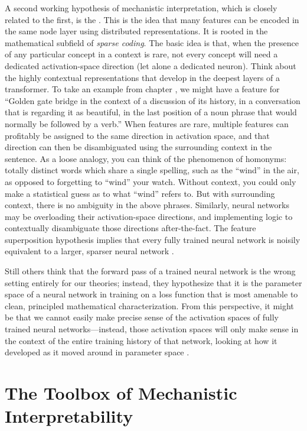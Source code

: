 A second working hypothesis of mechanistic interpretation, which is closely
related to the first, is the . This
is the idea that many features can be encoded in the same node layer using
distributed representations. It is rooted in the mathematical subfield of
\emph{sparse coding}. The basic idea is that, when the presence of any
particular concept in a context is rare, not every concept will need a
dedicated activation-space direction (let alone a dedicated neuron). Think
about the highly contextual representations that develop in the deepest layers
of a transformer. To take an example from chapter , we
might have a feature for ``Golden gate bridge in the context of a discussion of
its history, in a conversation that is regarding it as beautiful, in the last
position of a noun phrase that would normally be followed by a verb.'' When
features are rare, multiple features can profitably be assigned to the same
direction in activation space, and that direction can then be disambiguated
using the surrounding context in the sentence. As a loose analogy, you can
think of the phenomenon of homonyms: totally distinct words which share a
single spelling, such as the ``wind'' in the air, as opposed to forgetting to
``wind'' your watch. Without context, you could only make a statistical guess
as to what ``wind'' refers to. But with surrounding context, there is no
ambiguity in the above phrases. Similarly, neural networks may be overloading
their activation-space directions, and implementing logic to contextually
disambiguate those directions after-the-fact. The feature superposition
hypothesis implies that every fully trained neural network is noisily
equivalent to a larger, sparser neural network \cite{elhage2022superposition}.

Still others think that the forward pass of a trained neural network is the
wrong setting entirely for our theories; instead, they hypothesize that it is
the parameter space of a neural network in training on a loss function that is
most amenable to clean, principled mathematical characterization. From this
perspective, it might be that we cannot easily make precise sense of the
activation spaces of fully trained neural networks---instead, those activation
spaces will only make sense in the context of the entire training history of
that network, looking at how it developed as it moved around in parameter
space \cite{hoogland2025lossland, bushnaq2024degeneracy}.

\section{The Toolbox of Mechanistic Interpretability}


